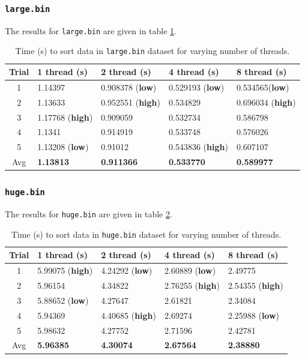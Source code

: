 \documentclass[a4paper,12pt]{article}
\theoremstyle{definition}
\theoremstyle{remark}
\begin{document}
	\subsubsection{\texttt{large.bin}}
	The results for \texttt{large.bin} are given in table \ref{tab:large}.
	\begin{table}[h]
		\centering
		\begin{tabular}{|c|l|l|l|l|}
			\hline
			\textbf{Trial}& \textbf{1 thread (s)}  &\textbf{2 thread (s)}  &\textbf{4  thread (s)}  &\textbf{8 thread (s)}  \\
			\hline\hline
			1& 1.14397 &0.908378 (\textbf{low})&0.529193  (\textbf{low})& 0.534565(\textbf{low})\\
			2&  1.13633 &0.952551 (\textbf{high})& 0.534829  &  0.696034 (\textbf{high})\\
			3& 1.17768 (\textbf{high}) & 0.909059 & 0.532734 & 0.586798 \\
			4&1.1341 &0.914919 & 0.533748&0.576026\\
			5& 1.13208 (\textbf{low})&0.91012 & 0.543836  (\textbf{high}) & 0.607107\\
			\hline
			Avg& \textbf{1.13813} &\textbf{0.911366} &\textbf{0.533770} & \textbf{0.589977}\\
			\hline
		\end{tabular}
		\caption{Time (s) to sort data in \texttt{large.bin} dataset for varying number of threads.}
		\label{tab:large}
	\end{table}
	\subsubsection{\texttt{huge.bin}}
	The results for \texttt{huge.bin} are given in table \ref{tab:huge}.
	\begin{table}[h]
		\centering
		\begin{tabular}{|c|l|l|l|l|}
			\hline
			\textbf{Trial}& \textbf{1 thread (s)}  &\textbf{2 thread (s)}  &\textbf{4  thread (s)}  &\textbf{8 thread (s)}  \\
			\hline\hline
			1& 5.99075  (\textbf{high})&4.24292  (\textbf{low})&2.60889  (\textbf{low}) & 2.49775\\
			2&  5.96154 	&4.34822  &2.76255  (\textbf{high})&  2.54355  (\textbf{high})\\
			3& 5.88652  (\textbf{low})& 4.27647 & 2.61821 &2.34084 \\
			4& 5.94369 	& 4.40685   (\textbf{high})	& 2.69274 &2.25988  (\textbf{low}) \\
			5& 5.98632  &4.27752 & 2.71596 & 2.42781 \\
			\hline
			Avg& \textbf{5.96385} &\textbf{4.30074} &\textbf{2.67564} & \textbf{2.38880}\\
			\hline
		\end{tabular}
		\caption{Time (s) to sort data in \texttt{huge.bin} dataset for varying number of threads.}
		\label{tab:huge}
	\end{table}
\end{document}
